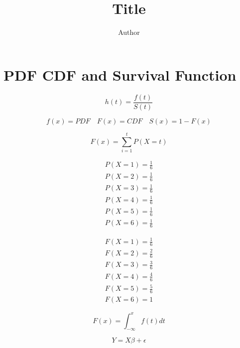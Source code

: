\documentclass{article}
\begin{document}
\title{Title}

\author{Author}

\maketitle

\section{PDF CDF and Survival Function}

\begin{equation}
	h(t) = \frac{f(t)}{S(t)}
\end{equation}

\begin{equation}
	f(x) = PDF \quad F(x) = CDF \quad S(x) = 1 - F(x) 
\end{equation}

\begin{equation}
	F(x) = \sum_{i=1}^t P(X = t)
\end{equation}

\begin{align}
	P(X = 1) = \frac{1}{6}\\
	P(X = 2) = \frac{1}{6}\\
	P(X = 3) = \frac{1}{6}\\
	P(X = 4) = \frac{1}{6}\\
	P(X = 5) = \frac{1}{6}\\
	P(X = 6) = \frac{1}{6}
\end{align}

\begin{align}
	F(X = 1) = \frac{1}{6} \\
	F(X = 2) = \frac{2}{6} \\
	F(X = 3) = \frac{3}{6} \\
	F(X = 4) = \frac{4}{6} \\
	F(X = 5) = \frac{5}{6} \\
	F(X = 6) = 1
\end{align}

\begin{equation}
	F(x) = \int_{-\infty}^x  f(t) dt
\end{equation}

\begin{equation}
	Y = X \beta + \epsilon 
\end{equation}
\end{document}
